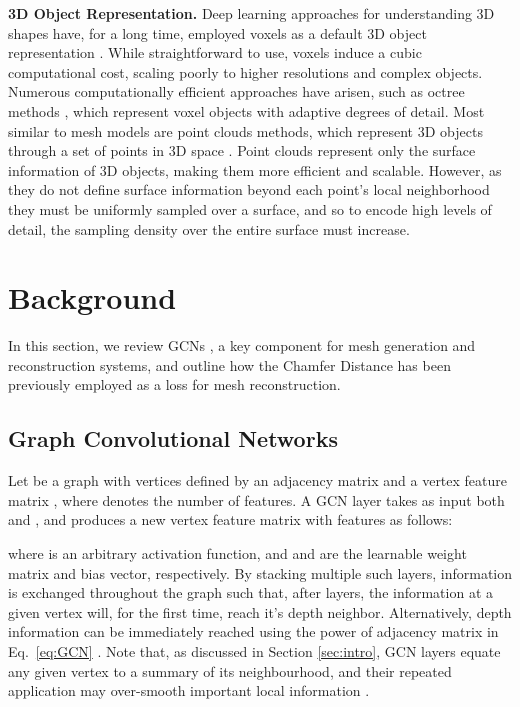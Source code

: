 \documentclass{article}
\begin{document}
\textbf{3D Object Representation.} \enskip 
Deep learning approaches for understanding 3D shapes have, for a long time, employed voxels as a default 3D object representation \cite{choy20163d, 3DGAN, mine, tulsiani2017multi, marrnet, wu2018learning}. While straightforward to use, voxels induce a cubic computational cost, scaling poorly to higher resolutions and complex objects. Numerous computationally efficient approaches have arisen, such as octree methods \cite{riegler2017octnet, OGN, HSP}, which represent voxel objects with adaptive degrees of detail. 
Most similar to mesh models are point clouds methods, which represent 3D objects through a set of points in 3D space \cite{fan2017point, qi2017pointnet, insafutdinov2018unsupervised, novotny2017learning}. Point clouds represent only the surface information of 3D objects, making them more efficient and scalable. However, as they do not define surface information beyond each point's local neighborhood they must be uniformly sampled over a surface, and so to encode high levels of detail, the sampling density over the entire surface must increase. 

\section{Background}

In this section, we review GCNs \cite{GCN}, a key component for mesh generation and reconstruction systems, and outline how the Chamfer Distance has been previously employed as a loss for mesh reconstruction. 


\subsection{Graph Convolutional Networks}
\label{ssec:GCN}
Let  be a graph with  vertices defined by an adjacency matrix  and a vertex feature matrix , where  denotes the number of features. 
A GCN layer takes as input both  and , and produces a new vertex feature matrix  with  features as follows:

where  is an arbitrary activation function, and  and  are the learnable weight matrix and bias vector, respectively. By stacking multiple such layers, information is exchanged throughout the graph such that, after  layers, the information at a given vertex will, for the first time, reach it's  depth neighbor. Alternatively,  depth information can be immediately reached using the  power of adjacency matrix in Eq.~\ref{eq:GCN} \cite{Defferrard:2016:CNN:3157382.3157527, levie2017cayleynets, Cucurull2018ConvolutionalNN}. Note that, as discussed in Section \ref{sec:intro}, GCN layers equate any given vertex to a summary of its neighbourhood, and their repeated application may over-smooth important local information \cite{Li2018DeeperII}.
\end{document}
